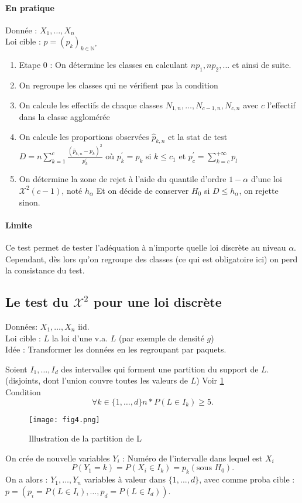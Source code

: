 \documentclass{article}
\theoremstyle{plain}%
\theoremstyle{definition}
\theoremstyle{remark}
\begin{document}
\paragraph{En pratique}
    Donnée : $ X_1, \dots, X_n$ \\
    Loi cible : $p = (p_k)_{k \in \mathbb{N}^*}$
    \begin{enumerate}
        \item Etape 0 : On détermine les classes en calculant $ np_1, np_2, ... $ et ainsi de suite.
        \item On regroupe les classes qui ne vérifient pas la condition
        \item On calcule les effectifs de chaque classes $ N_{1,n}, \dots, N_{c-1, n}, N_{c,n} $ avec $ c $ l'effectif dans la classe agglomérée
        \item On calcule les proportions observées $ \hat{p}_{k,n} $ et la stat de test $ D = n \sum_{k=1}^{c} \frac{(\hat{p}_{k,n} - p_k)^2}{p_k^\prime } $ où $ p_k^\prime = p_k $ si $ k \leq c_1 $ et $ p^\prime _c = \sum_{k=c}^{+\infty } p_l $ 
        \item On détermine la zone de rejet à l'aide du quantile d'ordre $ 1 - \alpha $ d'une loi $ \mathcal{X}^2(c-1) $, noté $ h_\alpha  $ Et on décide de conserver $ H_0 $ si $ D \leq h_\alpha  $, on rejette sinon.
    \end{enumerate}

\paragraph{Limite}
Ce test permet de tester l'adéquation à n'importe quelle loi discrète au niveau $ \alpha  $. Cependant, dès lors qu'on regroupe des classes (ce qui est obligatoire ici) on perd la consistance du test. 


\subsection{Le test du $ \mathcal{X}^2$ pour une loi discrète}
Données: $ X_1, \dots, X_n $ iid. \\
Loi cible : $ L $ la loi d'une v.a. $ L $ (par exemple de densité $ g $) \\
Idée : Transformer les données en les regroupant par paquets. 

Soient $ I_1, \dots, I_d $ des intervalles qui forment une partition du support de $ L $. (disjoints, dont l'union couvre toutes les valeurs de $ L $) Voir \ref{fig4} \\
Condition 
\[
    \forall k \in \{1, \dots,d \} n * P(L \in I_k) \geq 5
.\]
\begin{figure}[!htbp]
    \centering
    \texttt{[image: fig4.png]}
    \caption{Illustration de la partition de L}
    \label{fig4}
\end{figure}
On crée de nouvelle variables $ Y_i $ : Numéro de l'intervalle dans lequel est $ X_i $ 
\[
    P(Y_1=k) = P(X_i \in I_k) = p_k (\text{sous }H_0)
.\]
On a alors : $ Y_1, \dots, Y_n $ variables à valeur dans $ \{1,...,d\} $, avec comme proba cible : $ p=(p_i = P(L \in I_i), \dots, p_d = P(L \in I_d)) $. 
\end{document}
